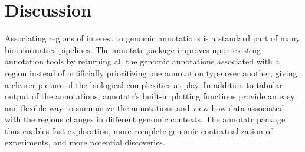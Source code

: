 \section{Discussion}
\label{annotatr_discussion}

Associating regions of interest to genomic annotations is a standard part of many bioinformatics pipelines. The annotatr package improves upon existing annotation tools by returning all the genomic annotations associated with a region instead of artificially prioritizing one annotation type over another, giving a clearer picture of the biological complexities at play. In addition to tabular output of the annotations, annotatr's built-in plotting functions provide an easy and flexible way to summarize the annotations and view how data associated with the regions changes in different genomic contexts. The annotatr package thus enables fast exploration, more complete genomic contextualization of experiments, and more potential discoveries.
